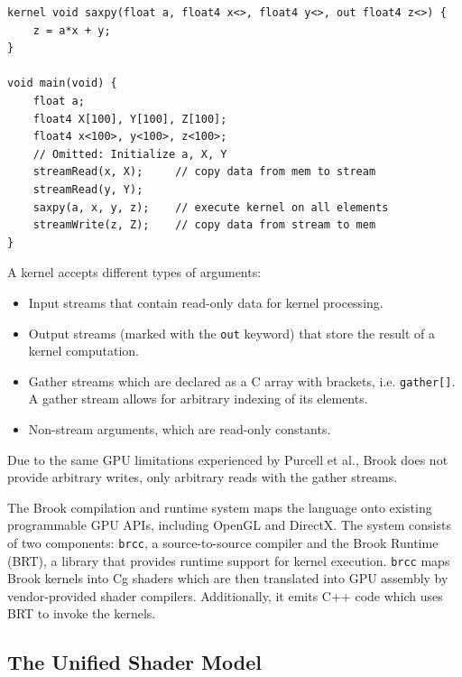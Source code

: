 \begin{lstlisting}[style=BrookStyle, caption=Brook saxpy example, float, floatplacement=H, label={lst:brook_saxpy}]
kernel void saxpy(float a, float4 x<>, float4 y<>, out float4 z<>) {
    z = a*x + y;
}

void main(void) {
    float a;
    float4 X[100], Y[100], Z[100];
    float4 x<100>, y<100>, z<100>;
    // Omitted: Initialize a, X, Y
    streamRead(x, X);     // copy data from mem to stream
    streamRead(y, Y);
    saxpy(a, x, y, z);    // execute kernel on all elements
    streamWrite(z, Z);    // copy data from stream to mem
}   
\end{lstlisting}

A kernel accepts different types of arguments:

\begin{itemize}
    \item Input streams that contain read-only data for kernel processing.
    \item Output streams (marked with the \texttt{out} keyword) that store the result of a kernel computation.
    \item Gather streams which are declared as a C array with brackets, i.e. \texttt{gather[]}. A gather stream allows for arbitrary indexing of its elements.
    \item Non-stream arguments, which are read-only constants.
\end{itemize}

Due to the same GPU limitations experienced by Purcell et al., Brook does not provide arbitrary writes, only arbitrary reads with the gather streams.

The Brook compilation and runtime system maps the language onto existing programmable GPU APIs, including OpenGL and DirectX. The system consists of two components: \texttt{brcc}, a source-to-source compiler and the Brook Runtime (BRT), a library that provides runtime support for kernel execution. \texttt{brcc} maps Brook kernels into Cg shaders which are then translated into GPU assembly by vendor-provided shader compilers. Additionally, it emits C++ code which uses BRT to invoke the kernels.

\subsection{The Unified Shader Model}

